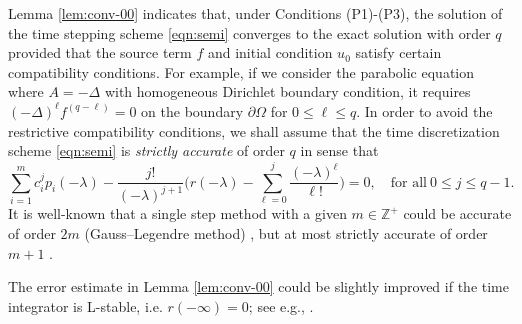 \begin{remark}\label{rem:conv-00}
Lemma \ref{lem:conv-00} indicates that, under Conditions (P1)-(P3), the
solution of the time stepping scheme \eqref{eqn:semi} converges to the exact solution with order $q$
provided that the source term $f$ and initial condition $u_0$
satisfy certain compatibility conditions.
For example, if we consider the parabolic equation where  $A=-\Delta$ with homogeneous Dirichlet boundary condition,
it requires
$(-\Delta)^{\ell} f^{(q-\ell)}= 0$ on the boundary $\partial\Omega$ for $0\le \ell\le q$.
In order to avoid the restrictive compatibility conditions, we shall assume that the time discretization scheme \eqref{eqn:semi} is \textsl{strictly accurate} of order $q$ in sense that
$$ \sum_{i=1}^m c_i^j p_i(-\lambda) - \frac{j!}{(-\lambda)^{j+1}}\Big( r (-\lambda)
- \sum_{\ell=0}^j \frac{(-\lambda)^\ell}{\ell!}\Big) =0,\quad\text{for all}~ 0\le j\le q-1. $$
It is well-known that a single step method
with a given $m \in \mathbb{Z}^+$ could be accurate of order $2m$ (Gauss--Legendre method) \cite[Section 2.2]{Ehle:thesis},
but at most strictly accurate of order $m+1$ \cite[Lemma 5]{BrennerCrouzeixThomee:1982}.
\end{remark}


\begin{remark}\label{rem:conv-01}
The error estimate in Lemma \ref{lem:conv-00} could be slightly improved if the time integrator is L-stable, i.e. $r(-\infty) =0$; see e.g., \cite[Theorem 7.2]{Thomee:2006}.
\end{remark}





